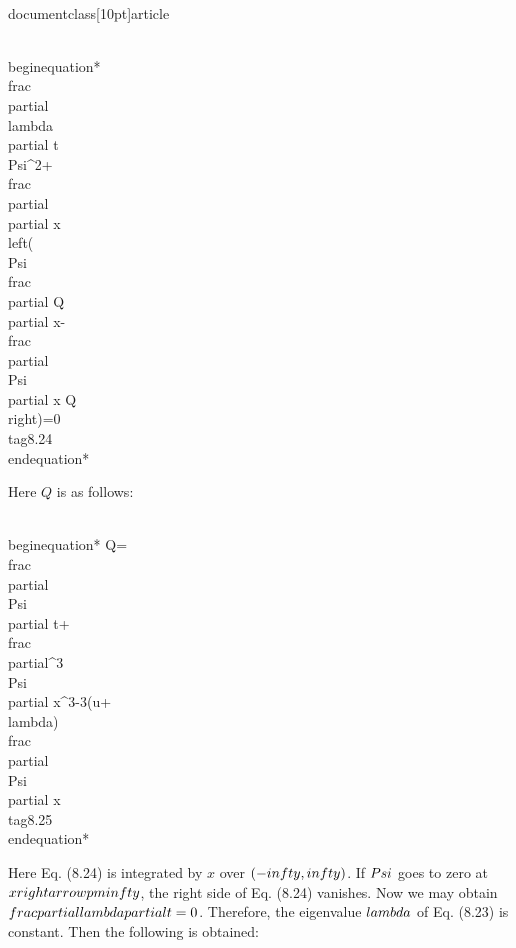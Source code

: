 \\documentclass[10pt]{article}
\begin{document}
{{{{{\\begin{equation*}
\\frac{\\partial \\lambda}{\\partial t} \\Psi^{2}+\\frac{\\partial}{\\partial x}\\left(\\Psi \\frac{\\partial Q}{\\partial x}-\\frac{\\partial \\Psi}{\\partial x} Q\\right)=0 \\tag{8.24}
\\end{equation*}


Here $Q$ is as follows:


\\begin{equation*}
Q=\\frac{\\partial \\Psi}{\\partial t}+\\frac{\\partial^{3} \\Psi}{\\partial x^{3}}-3(u+\\lambda) \\frac{\\partial \\Psi}{\\partial x} \\tag{8.25}
\\end{equation*}


Here Eq. (8.24) is integrated by $x$ over $(-\\infty, \\infty)$. If $\\Psi$ goes to zero at $x \\rightarrow \\pm \\infty$, the right side of Eq. (8.24) vanishes. Now we may obtain $\\frac{\\partial \\lambda}{\\partial t}=0$. Therefore, the eigenvalue $\\lambda$ of Eq. (8.23) is constant. Then the following is obtained:


}}}}}
\end{document}
